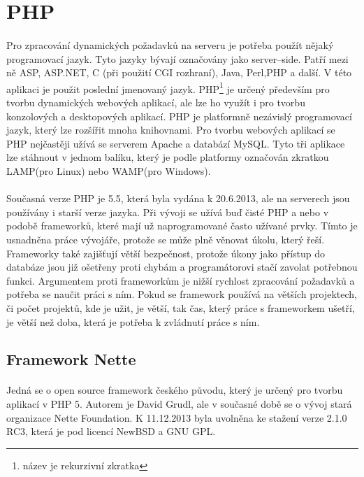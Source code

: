 \documentclass[11pt,a4paper,titlepage,oneside]{book}
\begin{document}
	\section{PHP}
		\paragraph{} Pro zpracování dynamických požadavků na serveru je potřeba použít nějaký programovací jazyk. Tyto jazyky bývají označovány jako server--side. Patří mezi ně ASP, ASP.NET, C (při použití \ac{CGI} rozhraní), Java, Perl,\acs{PHP} a další. V této aplikaci je použit poslední jmenovaný jazyk. \ac{PHP}\footnote{název je rekurzivní zkratka} je určený především pro tvorbu dynamických webových aplikací, ale lze ho využít i pro tvorbu konzolových a desktopových aplikací. PHP je platformně nezávislý programovací jazyk, který lze rozšířit mnoha knihovnami. Pro tvorbu webových aplikací se \ac{PHP} nejčastěji užívá se serverem Apache a databází MySQL. Tyto tři aplikace lze stáhnout v jednom balíku, který je podle platformy označován zkratkou LAMP(pro Linux) nebo WAMP(pro Windows)\cite{wiki_php}.


		\paragraph{} Současná verze PHP je 5.5, která byla vydána k 20.6.2013\cite{php_net}, ale na serverech jsou používány i starší verze jazyka. Při vývoji se užívá buď čisté PHP a nebo v podobě frameworků, které mají už naprogramované často užívané prvky. Tímto je usnadněna práce vývojáře, protože se může plně věnovat úkolu, který řeší. Frameworky také zajišťují větší bezpečnost, protože úkony jako přístup do databáze jsou již ošetřeny proti chybám a programátorovi stačí zavolat potřebnou funkci. Argumentem proti frameworkům je nižší rychlost zpracování požadavků a potřeba se naučit práci s ním\cite{wiki_framework}. Pokud se framework používá na větších projektech, či počet projektů, kde je užit, je větší, tak čas, který práce s frameworkem ušetří, je větší než doba, která je potřeba k zvládnutí práce s ním.
		\subsection{Framework Nette}
			\paragraph{} Jedná se o open source framework českého původu, který je určený pro tvorbu aplikací v PHP 5.  Autorem je David Grudl, ale v současné době se o vývoj stará organizace Nette Foundation. K 11.12.2013 byla uvolněna ke stažení verze 2.1.0 RC3, která je pod licencí NewBSD a GNU \ac{GPL}.  
\end{document}
